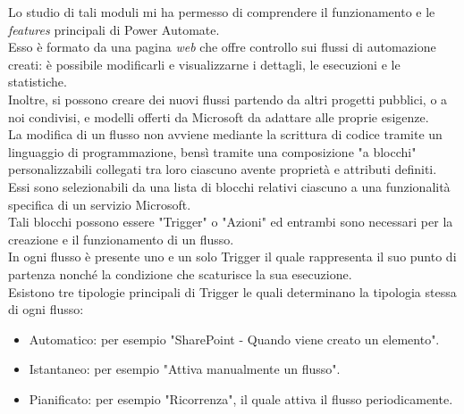 \noindent Lo studio di tali moduli mi ha permesso di comprendere il funzionamento e le \emph{features} principali di Power Automate.\\
Esso è formato da una pagina \emph{web} che offre controllo sui flussi di automazione creati: è possibile modificarli e visualizzarne i dettagli, le esecuzioni e le statistiche.\\
Inoltre, si possono creare dei nuovi flussi partendo da altri progetti pubblici, o a noi condivisi, e modelli offerti da Microsoft da adattare alle proprie esigenze.\\
La modifica di un flusso non avviene mediante la scrittura di codice tramite un linguaggio di programmazione, bensì tramite una composizione "a blocchi" personalizzabili collegati tra loro ciascuno avente proprietà e attributi definiti.\\
Essi sono selezionabili da una lista di blocchi relativi ciascuno a una funzionalità specifica di un servizio Microsoft.\\
Tali blocchi possono essere "Trigger" o "Azioni" ed entrambi sono necessari per la creazione e il funzionamento di un flusso.\\
In ogni flusso è presente uno e un solo Trigger il quale rappresenta il suo punto di partenza nonché la condizione che scaturisce la sua esecuzione.\\
Esistono tre tipologie principali di Trigger le quali determinano la tipologia stessa di ogni flusso:
\begin{itemize}
    \item Automatico: per esempio "SharePoint - Quando viene creato un elemento". 
    \item Istantaneo: per esempio "Attiva manualmente un flusso".
    \item Pianificato: per esempio "Ricorrenza", il quale attiva il flusso periodicamente.\\
\end{itemize}

